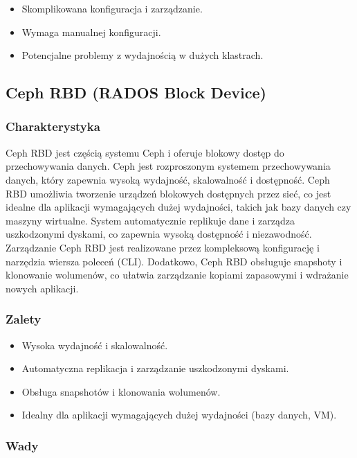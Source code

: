 \documentclass[polish,envcountsect,10pt]{article}
\begin{document}
\begin{itemize}
    \item Skomplikowana konfiguracja i zarządzanie.
    \item Wymaga manualnej konfiguracji.
    \item Potencjalne problemy z wydajnością w dużych klastrach.
\end{itemize}

\subsection{Ceph RBD (RADOS Block Device)}

\subsubsection{Charakterystyka}

Ceph RBD jest częścią systemu Ceph i oferuje blokowy dostęp do przechowywania danych. Ceph jest rozproszonym systemem przechowywania danych, który zapewnia wysoką wydajność, skalowalność i dostępność. Ceph RBD umożliwia tworzenie urządzeń blokowych dostępnych przez sieć, co jest idealne dla aplikacji wymagających dużej wydajności, takich jak bazy danych czy maszyny wirtualne. System automatycznie replikuje dane i zarządza uszkodzonymi dyskami, co zapewnia wysoką dostępność i niezawodność. Zarządzanie Ceph RBD jest realizowane przez kompleksową konfigurację i narzędzia wiersza poleceń (CLI). Dodatkowo, Ceph RBD obsługuje snapshoty i klonowanie wolumenów, co ułatwia zarządzanie kopiami zapasowymi i wdrażanie nowych aplikacji.

\subsubsection{Zalety}

\begin{itemize}
    \item Wysoka wydajność i skalowalność.
    \item Automatyczna replikacja i zarządzanie uszkodzonymi dyskami.
    \item Obsługa snapshotów i klonowania wolumenów.
    \item Idealny dla aplikacji wymagających dużej wydajności (bazy danych, VM).
\end{itemize}

\subsubsection{Wady}
\end{document}
